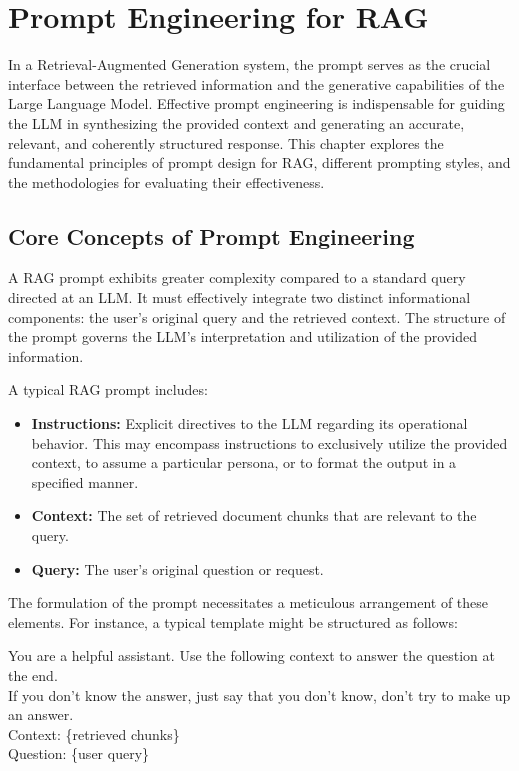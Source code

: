 \chapter{Prompt Engineering for RAG}
\label{chap:prompt_engineering}

In a Retrieval-Augmented Generation system, the prompt serves as the crucial interface between the retrieved information and the generative capabilities of the Large Language Model. Effective prompt engineering is indispensable for guiding the LLM in synthesizing the provided context and generating an accurate, relevant, and coherently structured response. This chapter explores the fundamental principles of prompt design for RAG, different prompting styles, and the methodologies for evaluating their effectiveness.

\section{Core Concepts of Prompt Engineering}
A RAG prompt exhibits greater complexity compared to a standard query directed at an LLM. It must effectively integrate two distinct informational components: the user's original query and the retrieved context. The structure of the prompt governs the LLM's interpretation and utilization of the provided information.

A typical RAG prompt includes:
\begin{itemize}
    \item \textbf{Instructions:} Explicit directives to the LLM regarding its operational behavior. This may encompass instructions to exclusively utilize the provided context, to assume a particular persona, or to format the output in a specified manner.
    \item \textbf{Context:} The set of retrieved document chunks that are relevant to the query.
    \item \textbf{Query:} The user's original question or request.
\end{itemize}

The formulation of the prompt necessitates a meticulous arrangement of these elements. For instance, a typical template might be structured as follows:

\begin{tcolorbox}[promptbox,title=Example: A Typical RAG prompt]
You are a helpful assistant. Use the following context to answer the question at the end.\\
If you don't know the answer, just say that you don't know, don't try to make up an answer.\\

Context: \{retrieved chunks\}\\

Question: \{user query\}
\end{tcolorbox}

